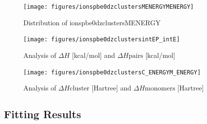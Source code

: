 \documentclass[journal=jacsat,manuscript=article]{achemso}
\begin{document}
\begin{figure}
    \centering
    \texttt{[image: figures/ionspbe0dzclustersMENERGYMENERGY]}
    \caption{ Distribution of ionspbe0dzclustersMENERGY }
    \label{fig:ionspbe0dzclusterssinglekey}
\end{figure}

\begin{figure}
    \centering
    \texttt{[image: figures/ionspbe0dzclustersintEP\_intE]}
    \caption{ Analysis of $\Delta H$ [kcal/mol] and $\Delta H{\mathrm{pairs}}$ [kcal/mol] }
    \label{fig:ionspbe0dzclusters_intE_P_intE}
\end{figure}

\begin{figure}
    \centering
    \texttt{[image: figures/ionspbe0dzclustersC\_ENERGYM\_ENERGY]}
    \caption{ Analysis of $\Delta H{\mathrm{cluster}}$ [Hartree] and $\Delta H{\mathrm{monomers}}$ [Hartree] }
    \label{fig:ionspbe0dzclusters_C_ENERGY_M_ENERGY}
\end{figure}
\newpage 
 \subsection{Fitting Results}
\newpage 
\end{document}
